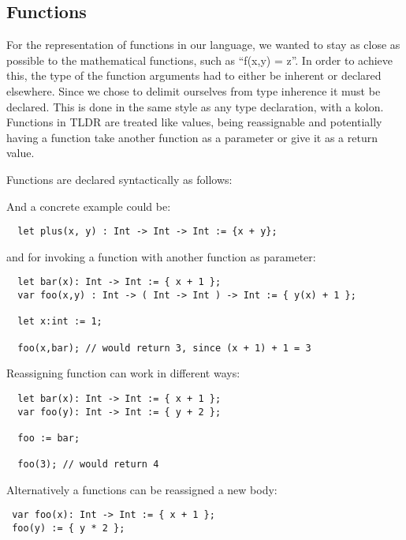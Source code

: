 \subsection{Functions}
\label{subsec:functions}

For the representation of functions in our language, we wanted to stay as close as possible to the mathematical functions, such as \enquote{f(x,y) = z}. In order to achieve this, the type of the function arguments had to either be inherent or declared elsewhere. Since we chose to delimit ourselves from type inherence it must be declared. This is done in the same style as any type declaration, with a kolon. Functions in TLDR are treated like values, being reassignable and potentially having a function take another function as a parameter or give it as a return value.

Functions are declared syntactically as follows:


And a concrete example could be:

\begin{verbatim}
  let plus(x, y) : Int -> Int -> Int := {x + y};
\end{verbatim}

and for invoking a function with another function as parameter:

\begin{verbatim}
  let bar(x): Int -> Int := { x + 1 };
  var foo(x,y) : Int -> ( Int -> Int ) -> Int := { y(x) + 1 };

  let x:int := 1;

  foo(x,bar); // would return 3, since (x + 1) + 1 = 3
\end{verbatim}

Reassigning function can work in different ways:

\begin{verbatim}
  let bar(x): Int -> Int := { x + 1 };
  var foo(y): Int -> Int := { y + 2 };

  foo := bar;

  foo(3); // would return 4
\end{verbatim}

Alternatively a functions can be reassigned a new body:

\begin{verbatim}
 var foo(x): Int -> Int := { x + 1 };
 foo(y) := { y * 2 };
\end{verbatim}


